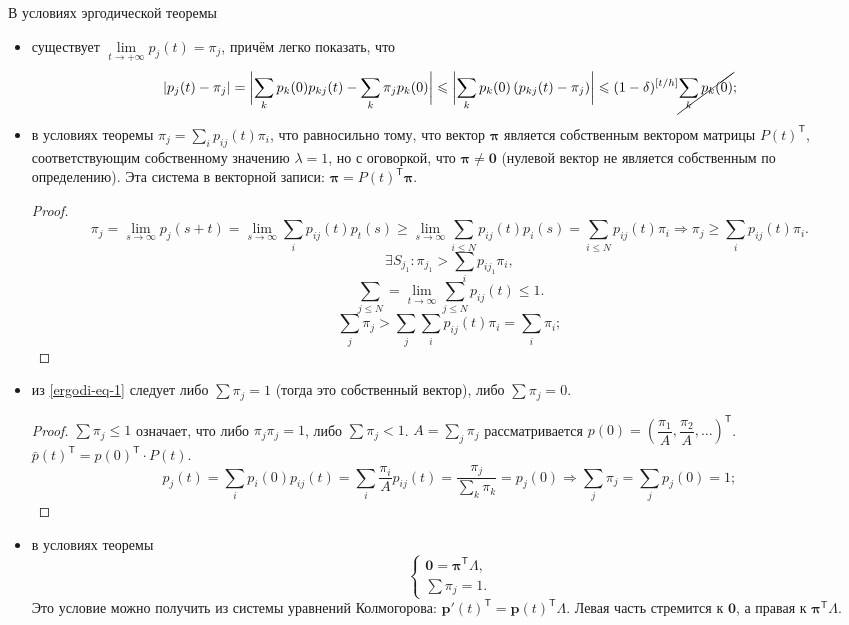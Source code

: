 \begin{corollary*}
  В условиях эргодической теоремы
  \begin{itemize}[label=--]
    \item существует $\lim\limits_{t\to +\infty} p_j(t) = \pi_j$, причём легко показать, 
      что
      \[
        |p_j(t) - \pi_j| = \biggl|\sum_{k} p_k(0) p_{kj}(t) - \sum_{k} \pi_j
        p_{k}(0)\biggr|
        \leqslant \biggl|\sum_k p_k(0) \left( p_{kj}(t) - \pi_j \right) \biggr|
        \leqslant (1-\delta)^{ \left[ t/h \right] } \cancel{\sum_{k} p_k(0)};
      \]

    \item в условиях теоремы $\pi_j = \sum_{i} p_{ij}(t) \pi_i$, что равносильно
      тому, что вектор $\bm\pi$ является
      собственным вектором матрицы $P(t)^{\mathsf T}$, соответствующим
      собственному значению $\lambda = 1$, но с оговоркой,
      что $\bm\pi \neq \mathbf 0$ (нулевой вектор не является собственным по определению).
      Эта система в векторной записи: $\bm\pi = P(t)^{\mathsf T} \bm\pi$.
      \begin{proof}
        \[
          \pi_j = \lim_{s\to\infty} p_j(s+t) = \lim_{s\to\infty} \sum_i p_{ij}(t) p_t(s)
          \geqslant \lim_{s\to\infty} \sum_{i \leqslant N} p_{ij}(t) p_i(s)
          = \sum_{i \leqslant N} p_{ij}(t) \pi_i \Rightarrow \pi_j \geqslant \sum_i p_{ij}(t) \pi_i.
        \]
        \[
          \exists S_{j_1}\colon \pi_{j_1} > \sum_i p_{ij_1} \pi_i,
        \]
        \[
          \sum_{j\leqslant N} = \lim_{t\to\infty} \sum_{j\leqslant N} p_{ij}(t) \leqslant 1.
        \]
        \[
          \sum_j \pi_j > \sum_j \sum_i p_{ij}(t) \pi_i = \sum_i \pi_i;
        \]
      \end{proof}

    \item из \eqref{ergodi-eq-1} следует либо $\sum \pi_j = 1$ (тогда это
      собственный вектор), либо $\sum \pi_j = 0$.
      \begin{proof}
        $\sum \pi_j \leqslant 1$ означает, что либо $\pi_j \pi_j = 1$, либо
        $\sum \pi_j < 1$. 
        $A = \sum_j \pi_j$ рассматривается
        $p(0) = \left( \dfrac{\pi_1}{A}, \dfrac{\pi_2}{A}, \dots
        \right)^{\mathsf T}$.
        $\bar p(t)^{\mathsf T} = p(0)^{\mathsf T} \cdot P(t)$.
        \[
          p_j(t) = \sum_i p_i(0) p_{ij}(t) = \sum_i \dfrac{\pi_i}{A} p_{ij}(t)
          = \dfrac{\pi_j}{\sum_{k} \pi_k} = p_j(0)
          \Rightarrow
          \sum_j \pi_j = \sum_j p_j(0) = 1;
        \]
      \end{proof}
    \item в условиях теоремы $$\begin{cases} \mathbf{0} = \bm\pi^{\mathsf T} \Lambda,
      \\ \sum \pi_j = 1.\end{cases}$$
      Это условие можно получить из системы уравнений Колмогорова:
      $\mathbf p'(t)^{\mathsf T} = \mathbf p(t)^{\mathsf T} \Lambda$. Левая
      часть стремится к $\mathbf{0}$, 
      а правая к $\bm\pi^{\mathsf T} \Lambda$.
  \end{itemize}
\end{corollary*}
